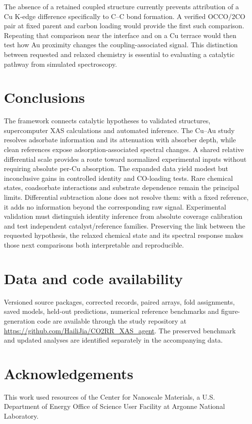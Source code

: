 \documentclass[11pt,a4paper]{article}
\begin{document}
The absence of a retained coupled structure currently prevents attribution of a Cu K-edge difference specifically to C--C bond formation. A verified OCCO/2CO pair at fixed parent and carbon loading would provide the first such comparison. Repeating that comparison near the interface and on a Cu terrace would then test how Au proximity changes the coupling-associated signal. This distinction between requested and relaxed chemistry is essential to evaluating a catalytic pathway from simulated spectroscopy.

\section{Conclusions}
The framework connects catalytic hypotheses to validated structures, supercomputer XAS calculations and automated inference. The Cu--Au study resolves adsorbate information and its attenuation with absorber depth, while clean references expose adsorption-associated spectral changes. A shared relative differential scale provides a route toward normalized experimental inputs without requiring absolute per-Cu absorption. The expanded data yield modest but inconclusive gains in controlled identity and CO-loading tests. Rare chemical states, coadsorbate interactions and substrate dependence remain the principal limits. Differential subtraction alone does not resolve them: with a fixed reference, it adds no information beyond the corresponding raw signal. Experimental validation must distinguish identity inference from absolute coverage calibration and test independent catalyst/reference families. Preserving the link between the requested hypothesis, the relaxed chemical state and its spectral response makes those next comparisons both interpretable and reproducible.

\section*{Data and code availability}
Versioned source packages, corrected records, paired arrays, fold assignments, saved models, held-out predictions, numerical reference benchmarks and figure-generation code are available through the study repository at \url{https://github.com/HailiJia/CO2RR_XAS_agent}. The preserved benchmark and updated analyses are identified separately in the accompanying data.
\section*{Acknowledgements}
This work used resources of the Center for Nanoscale Materials, a U.S. Department of Energy Office of Science User Facility at Argonne National Laboratory.
\begingroup\small\setlength{\parskip}{0pt}

\endgroup
\end{document}
